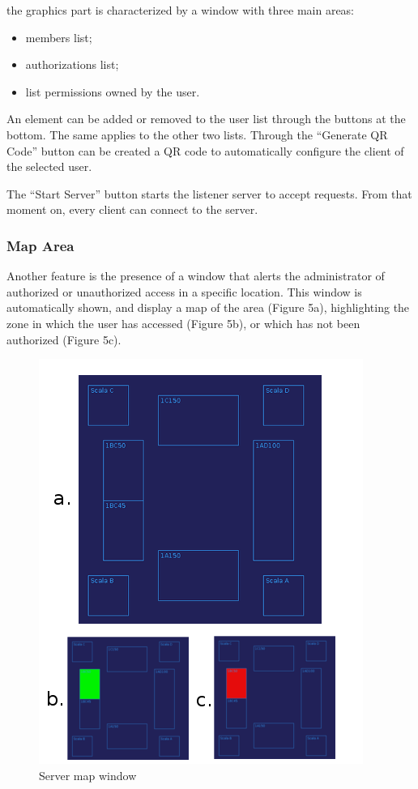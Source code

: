 \documentclass[conference]{IEEEtran}
\begin{document}
the graphics part is characterized by a window with three main areas:

\begin{itemize}
 \item members list;
 \item authorizations list;
 \item list permissions owned by the user.
\end{itemize}

An element can be added or removed to the user list through the buttons at the bottom. The same applies to the other two lists.
Through the ``Generate QR Code'' button can be created a QR code to automatically configure the client of the selected user.

The ``Start Server'' button starts the listener server to accept requests. From that moment on, every client can connect to the server.

\subsubsection{Map Area}

Another feature is the presence of a window that alerts the administrator of authorized or unauthorized access in a specific location. This window is automatically shown, and display a map of the area (Figure 5a), highlighting the zone in which the user has accessed (Figure 5b), or which has not been authorized (Figure 5c).

\begin{figure}[h]
\centering
\includegraphics[scale=0.5]{fig5}
\caption{Server map window}
\label{map}
\end{figure}
\end{document}
